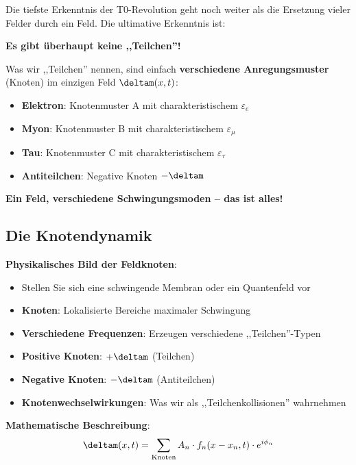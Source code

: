 	Die tiefste Erkenntnis der T0-Revolution geht noch weiter als die Ersetzung vieler Felder durch ein Feld. Die ultimative Erkenntnis ist:
	
	\begin{tcolorbox}[colback=purple!5!white,colframe=purple!75!black,title=Ultimative Wahrheit: Keine separaten Teilchen]
		\textbf{Es gibt überhaupt keine ,,Teilchen''!}
		
		Was wir ,,Teilchen'' nennen, sind einfach \textbf{verschiedene Anregungsmuster} (Knoten) im einzigen Feld $\deltam(x,t)$:
		
		\begin{itemize}
			\item \textbf{Elektron}: Knotenmuster A mit charakteristischem $\varepsilon_e$
			\item \textbf{Myon}: Knotenmuster B mit charakteristischem $\varepsilon_{\mu}$
			\item \textbf{Tau}: Knotenmuster C mit charakteristischem $\varepsilon_{\tau}$
			\item \textbf{Antiteilchen}: Negative Knoten $-\deltam$
		\end{itemize}
		
		\textbf{Ein Feld, verschiedene Schwingungsmoden -- das ist alles!}
	\end{tcolorbox}
	
	\subsection{Die Knotendynamik}
	
	\textbf{Physikalisches Bild der Feldknoten}:
	\begin{itemize}
		\item Stellen Sie sich eine schwingende Membran oder ein Quantenfeld vor
		\item \textbf{Knoten}: Lokalisierte Bereiche maximaler Schwingung
		\item \textbf{Verschiedene Frequenzen}: Erzeugen verschiedene ,,Teilchen''-Typen
		\item \textbf{Positive Knoten}: $+\deltam$ (Teilchen)
		\item \textbf{Negative Knoten}: $-\deltam$ (Antiteilchen)
		\item \textbf{Knotenwechselwirkungen}: Was wir als ,,Teilchenkollisionen'' wahrnehmen
	\end{itemize}
	
	\textbf{Mathematische Beschreibung}:
	\begin{equation}
		\deltam(x,t) = \sum_{\text{Knoten}} A_n \cdot f_n(x-x_n, t) \cdot e^{i\phi_n}
	\end{equation}
	
